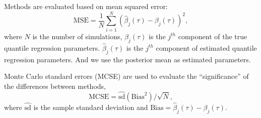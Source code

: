 \documentclass[12pt]{article}
\begin{document}
Methods are evaluated based on mean squared error:
\begin{displaymath}
  \mbox{MSE}  =  \frac{1}{N}\sum_{i = 1}^N (\hat{\beta}_j(\tau) -
  \beta_j(\tau))^2 ,
\end{displaymath}
where $N$ is the number of simulations, $\beta_j(\tau)$ is the
$j^{th}$ component of the true quantile regression
parameters. $\hat{\beta}_j(\tau)$ is the $j^{th}$ component of
estimated quantile regression parameters. And we use the posterior
mean as estimated parameters.

Monte Carlo standard errors (MCSE) are used to evaluate the
``significance'' of the differences between methods,
\begin{displaymath}
  \mbox{MCSE} = \hat{\mbox{sd}}(\mbox{Bias}^2)/\sqrt{N},
\end{displaymath}
where $\hat{\mbox{sd}}$ is the sample standard deviation and
$\mbox{Bias} = \hat{\beta}_{j}(\tau) - \beta_{j}(\tau)$.
\end{document}
